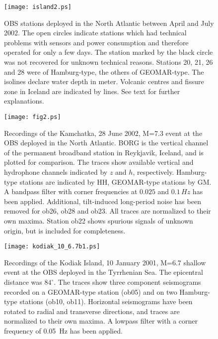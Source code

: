 \documentclass{article}
\renewcommand{\includegraphics}[2][1]{{\sf Figure: {\tt #1}}}
\begin{document}
{%
\begin{figure}
\centerline{\texttt{[image: island2.ps]}}
\caption{OBS stations deployed in the North Atlantic between 
April and July 2002.
The open circles indicate stations which had technical problems 
with sensors and power consumption and 
therefore operated for only a few days.
The station 
marked by the black circle
was not recovered for unknown technical reasons.
Stations 20, 21, 26 and 28 were of Hamburg-type, 
the others of GEOMAR-type. 
The isolines declare water depth in meter.
Volcanic centres and fissure zone in Iceland are indicated by lines.
See text for further explanations. 
}
\label{station_map}
\end{figure}

\begin{figure}
\centerline{\texttt{[image: fig2.ps]}}
\caption{Recordings 
of the Kamchatka, 28 June 2002, M=7.3 event 
at the OBS deployed in the 
North Atlantic. 
BORG is the vertical channel of the permanent broadband station in Reykjavik, Iceland,
and is plotted for comparison.
The traces show
available vertical and hydrophone channels
 indicated by $z$
and $h$, respectively.
Hamburg-type stations are indicated by HH, GEOMAR-type stations by GM.
A bandpass filter with corner frequencies at 
$0.025$ and $0.1 \, Hz$ has been 
applied. 
Additional, tilt-induced long-period noise has been removed for 
ob26, ob28 and ob23.
All traces are normalized to their own maxima.
Station ob22 shows spurious signals of unknown origin, but is included for 
completeness.
}
\label{kamchatka_M7.3}
\end{figure}

\begin{figure}
\centerline{\texttt{[image: kodiak\_10\_6.7b1.ps]}}
\caption{Recordings 
of the Kodiak Island, 10 January 2001, M=6.7 shallow event 
at the OBS deployed in the 
Tyrrhenian Sea. 
The epicentral distance was $84^{\circ}$.
The traces show three component seismograms recorded on a 
GEOMAR-type station (ob05) and on two Hamburg-type stations 
(ob10, ob11). 
Horizontal seismograms have been rotated to 
radial and
transverse directions,
and 
traces are normalized to their own maxima.
A lowpass filter with a corner frequency of
0.05\, Hz has been applied.
}
\label{quake_tysea}
\end{figure}

}
\end{document}
